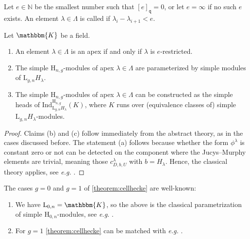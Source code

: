 \documentclass[a4paper,11pt]{amsart}
\let\emph\relax
\newcommand{\eg}{\textsl{e.g.}}
\newcommand{\setstuff}[1]{\mathrm{#1}}
\newcommand{\KK}{\mathbbm{K}}
\newcommand{\N}{\mathbb{N}}
\newcommand{\varsym}[1]{\mathtt{#1}}
\newcommand{\qvar}{\varsym{q}}
\numberwithin{equation}{section}
\let\fullref\autoref
\begin{document}
Let $e\in\N$ be the smallest number such that 
$[e]_{\qvar}=0$, or let $e=\infty$ if no such 
$e$ exists. An element $\lambda\in\Lambda$ is called 
\emph{$e$-restricted} if $\lambda_{i}-\lambda_{i+1}<e$.

\begin{theorem}\label{theorem:cellhecke}
Let $\KK$ be a field.
\begin{enumerate}

\item An element $\lambda\in\Lambda$ is an apex 
if and only if $\lambda$ is $e$-restricted.

\item The simple $\setstuff{H}_{n,g}$-modules of 
apex $\lambda\in\Lambda$ 
are parameterized by simple modules of $\setstuff{L}_{g,n}H_{\lambda}$.

\item The simple $\setstuff{H}_{n,g}$-modules of 
apex $\lambda\in\Lambda$ can be constructed as 
the simple heads of
$\mathrm{Ind}_{\setstuff{L}_{g,n}H_{\lambda}}^{\setstuff{H}_{n,g}}(K)$, 
where $K$ runs over (equivalence classes of) 
simple $\setstuff{L}_{g,n}H_{\lambda}$-modules.

\end{enumerate}
\end{theorem}

\begin{proof}
Claims (b) and (c) follow immediately from the abstract theory, as 
in the cases discussed before. The statement (a) follows 
because whether the form $\phi^{\lambda}$ is constant 
zero or not can be detected on the component where the Jucys--Murphy 
elements are trivial, meaning those $c_{D,b,U}^{\lambda}$ 
with $b=H_{\lambda}$.
Hence, the classical theory applies, see {\eg} 
\cite[Section 3.4]{Ma-hecke-schur}.
\end{proof}

\begin{example}
The cases $g=0$ and $g=1$ of \fullref{theorem:cellhecke}
are well-known:
\begin{enumerate}

\item We have $\setstuff{L}_{0,n}=\KK$, so the above 
is the classical parametrization 
of simple $\setstuff{H}_{0,n}$-modules, see {\eg} 
\cite[Section 3.4]{Ma-hecke-schur}.

\item For $g=1$ \fullref{theorem:cellhecke}
can be matched with {\eg} \cite[Theorem 5.8]{KoXi-affine-cellular}.

\end{enumerate}
\end{example}
\end{document}
